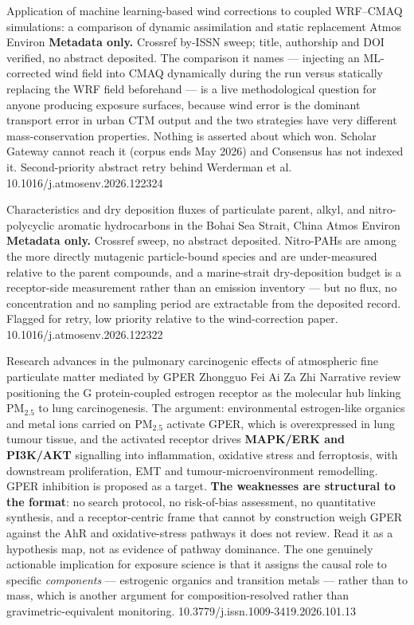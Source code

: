 \documentclass[10pt]{article}
\begin{document}
{Application of machine learning-based wind corrections to coupled WRF--CMAQ simulations: a comparison of dynamic assimilation and static replacement}
{Atmos Environ}
{\textbf{Metadata only.} Crossref by-ISSN sweep; title, authorship and DOI verified, no
abstract deposited. The comparison it names --- injecting an ML-corrected wind field into
CMAQ dynamically during the run versus statically replacing the WRF field beforehand ---
is a live methodological question for anyone producing exposure surfaces, because wind
error is the dominant transport error in urban CTM output and the two strategies have
very different mass-conservation properties. Nothing is asserted about which won. Scholar
Gateway cannot reach it (corpus ends May 2026) and Consensus has not indexed it.
Second-priority abstract retry behind Werderman et al.}
{10.1016/j.atmosenv.2026.122324}

{Characteristics and dry deposition fluxes of particulate parent, alkyl, and nitro-polycyclic aromatic hydrocarbons in the Bohai Sea Strait, China}
{Atmos Environ}
{\textbf{Metadata only.} Crossref sweep, no abstract deposited. Nitro-PAHs are among the
more directly mutagenic particle-bound species and are under-measured relative to the
parent compounds, and a marine-strait dry-deposition budget is a receptor-side
measurement rather than an emission inventory --- but no flux, no concentration and no
sampling period are extractable from the deposited record. Flagged for retry, low
priority relative to the wind-correction paper.}
{10.1016/j.atmosenv.2026.122322}


{Research advances in the pulmonary carcinogenic effects of atmospheric fine particulate matter mediated by GPER}
{Zhongguo Fei Ai Za Zhi}
{Narrative review positioning the G protein-coupled estrogen receptor as the molecular
hub linking PM$_{2.5}$ to lung carcinogenesis. The argument: environmental estrogen-like
organics and metal ions carried on PM$_{2.5}$ activate GPER, which is overexpressed in
lung tumour tissue, and the activated receptor drives \textbf{MAPK/ERK and PI3K/AKT}
signalling into inflammation, oxidative stress and ferroptosis, with downstream
proliferation, EMT and tumour-microenvironment remodelling. GPER inhibition is proposed
as a target. \textbf{The weaknesses are structural to the format}: no search protocol,
no risk-of-bias assessment, no quantitative synthesis, and a receptor-centric frame that
cannot by construction weigh GPER against the AhR and oxidative-stress pathways it does
not review. Read it as a hypothesis map, not as evidence of pathway dominance. The one
genuinely actionable implication for exposure science is that it assigns the causal role
to specific \emph{components} --- estrogenic organics and transition metals --- rather
than to mass, which is another argument for composition-resolved rather than
gravimetric-equivalent monitoring.}
{10.3779/j.issn.1009-3419.2026.101.13}
\end{document}
